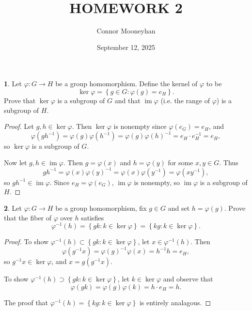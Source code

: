 \documentclass[12pt]{article}
\title{HOMEWORK 2}
\author{Connor Mooneyhan}
\date{September 12, 2025}
\DeclareMathOperator{\im}{im}
\theoremstyle{definition}
\newtheorem{ex}{}
\begin{document}
\maketitle

\begin{ex}
	Let $\varphi: G \to H$ be a group homomorphism.
	Define the kernel of $\varphi$ to be \begin{equation*}
		\ker \varphi = \left\lbrace g \in G : \varphi(g) = e_H \right\rbrace.
	\end{equation*}
	Prove that $\ker \varphi$ is a subgroup of $G$ and that $\im \varphi$ (i.e. the range of $\varphi$) is a subgroup of $H$.
\end{ex}
\begin{proof}
	Let $g, h \in \ker \varphi$.
	Then $\ker\varphi$ is nonempty since $\varphi(e_G) = e_H$, and \begin{equation*}
		\varphi(gh^{-1}) = \varphi(g)\varphi(h^{-1}) = \varphi(g)\varphi(h)^{-1} =  e_H \cdot e_H^{-1} = e_H,
	\end{equation*}
	so $\ker\varphi$ is a subgroup of $G$.

	Now let $g, h \in \im \varphi$.
	Then $g = \varphi(x)$ and $h = \varphi(y)$ for some $x, y \in G$.
	Thus \begin{equation*}
		gh^{-1} = \varphi(x)\varphi(y)^{-1} = \varphi(x)\varphi(y^{-1}) = \varphi(xy^{-1}),
	\end{equation*}
	so $gh^{-1} \in \im\varphi$.
	Since $e_H = \varphi(e_G)$, $\im\varphi$ is nonempty, so $\im\varphi$ is a subgroup of $H$.
\end{proof}

\begin{ex}
	Let $\varphi : G \to H$ be a group homomorphism, fix $g \in G$ and set $h = \varphi(g)$.
	Prove that the fiber of $\varphi$ over $h$ satisfies \begin{equation*}
		\varphi^{-1}(h) = \left\lbrace gk : k \in \ker \varphi \right\rbrace = \left\lbrace kg : k \in \ker \varphi \right\rbrace.
	\end{equation*}
\end{ex}
\begin{proof}
	To show $\varphi^{-1}(h) \subset \left\lbrace gk : k \in \ker \varphi \right\rbrace$, let $x \in \varphi^{-1}(h)$.
	Then \begin{equation*}
		\varphi(g^{-1}x) = \varphi(g)^{-1}\varphi(x) = h^{-1}h = e_H,
	\end{equation*}
	so $g^{-1}x \in \ker\varphi$, and $x = g \left( g^{-1}x \right)$.

	To show $\varphi^{-1}(h) \supset \left\lbrace gk : k \in \ker \varphi \right\rbrace$, let $k \in \ker\varphi$ and observe that \begin{equation*}
		\varphi(gk) = \varphi(g)\varphi(k) = h\cdot e_H = h.
	\end{equation*}

	The proof that $\varphi^{-1}(h) = \left\lbrace kg : k \in \ker \varphi \right\rbrace$ is entirely analagous.
\end{proof}
\end{document}
